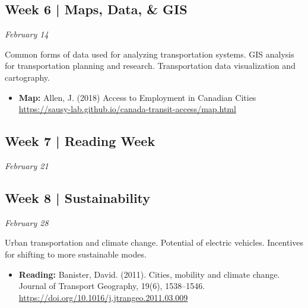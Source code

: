 \documentclass[11pt]{article}
\begin{document}
	\subsection*{Week 6 | Maps, Data, \& GIS}
	
	\textit{February 14}
		
	Common forms of data used for analyzing transportation systems. GIS analysis for transportation planning and research. Transportation data visualization and cartography.
	
	
	\begin{itemize}
		
		
		
		\item \textbf{Map:} Allen, J. (2018) Access to Employment in
		Canadian Cities \\ \url{https://sausy-lab.github.io/canada-transit-access/map.html}
		
		
		
	\end{itemize}
	
	
	
	
	\subsection*{Week 7 | Reading Week}
	
	\textit{February 21}
	
	
	
	\subsection*{Week 8 | Sustainability}
	
	\textit{February 28}
	
	Urban transportation and climate change. Potential of electric vehicles. Incentives for shifting to more sustainable modes.
	
	
	\begin{itemize}
		\item \textbf{Reading:} Banister, David. (2011). Cities, mobility and climate change. Journal of Transport
		Geography, 19(6), 1538–1546. \url{https://doi.org/10.1016/j.jtrangeo.2011.03.009}
	\end{itemize}

	
	
	
\end{document}
